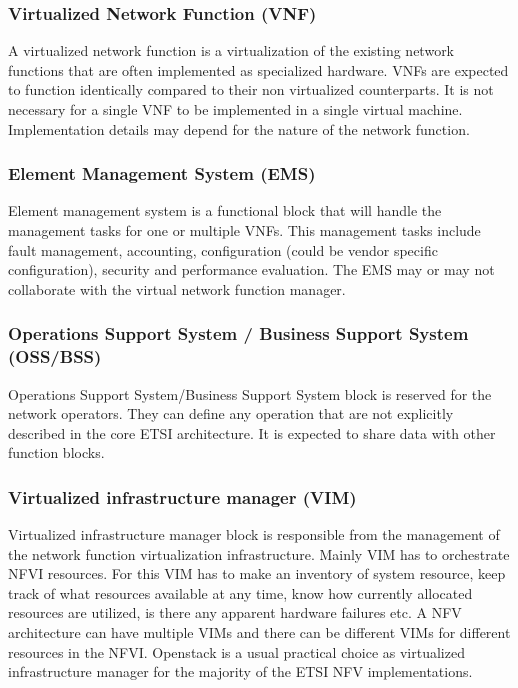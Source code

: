 \documentclass[12pt,oneandhalf,chaparabic,ceng,ms,eng,oneside,pntc]{gsufbe}
\begin{document}
\subsubsection{Virtualized Network Function (VNF)}
A virtualized network function is a virtualization of the existing network functions that are often
implemented as specialized hardware.  VNFs are expected to function identically compared to their non 
virtualized counterparts.  It is not necessary for a single VNF to be implemented in a single virtual
machine.  Implementation details may depend for the nature of the network function.

\subsubsection{Element Management System (EMS)}
Element management system is a functional block that will handle the management tasks for one or
multiple VNFs.  This management tasks include fault management, accounting, configuration (could be 
vendor specific configuration), security and performance evaluation.  The EMS may or may not collaborate
with the virtual network function manager.

\subsubsection{Operations Support System / Business Support System (OSS/BSS)}
Operations Support System/Business Support System block is reserved for the network
operators.  They can define any operation that are not explicitly described in the core
ETSI architecture.  It is expected to share data with other function blocks.

\subsubsection{Virtualized infrastructure manager (VIM)}
Virtualized infrastructure manager block is responsible from the management of the network function
virtualization infrastructure.  Mainly VIM has to orchestrate NFVI resources.  For this VIM has to make
an inventory of system resource, keep track of what resources available at any time, know how currently
allocated resources are utilized, is there any apparent hardware failures etc.
A NFV architecture can have multiple VIMs and there can be different VIMs for different resources in 
the NFVI.  Openstack is a usual practical choice as virtualized infrastructure manager for the majority
of the ETSI NFV implementations.
\end{document}
